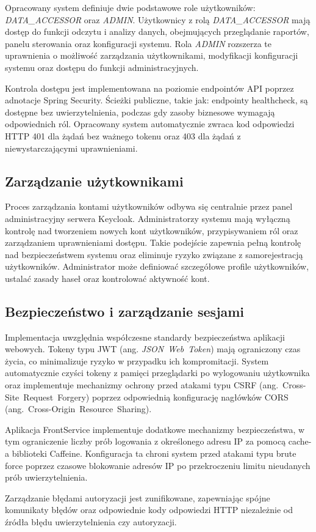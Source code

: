 Opracowany system definiuje dwie podstawowe role użytkowników: \textit{DATA\_ACCESSOR} oraz \textit{ADMIN}. Użytkownicy z rolą \textit{DATA\_ACCESSOR} mają dostęp do funkcji odczytu i analizy danych, obejmujących przeglądanie raportów, panelu sterowania oraz konfiguracji systemu. Rola \textit{ADMIN} rozszerza te uprawnienia o możliwość zarządzania użytkownikami, modyfikacji konfiguracji systemu oraz dostępu do funkcji administracyjnych.

Kontrola dostępu jest implementowana na poziomie endpointów API poprzez adnotacje Spring Security. Ścieżki publiczne, takie jak: endpointy healthcheck, są dostępne bez uwierzytelnienia, podczas gdy zasoby biznesowe wymagają odpowiednich ról. Opracowany system automatycznie zwraca kod odpowiedzi HTTP 401 dla żądań bez ważnego tokenu oraz 403 dla żądań z niewystarczającymi uprawnieniami.

\subsection{Zarządzanie użytkownikami}

Proces zarządzania kontami użytkowników odbywa się centralnie przez panel administracyjny serwera Keycloak. Administratorzy systemu mają wyłączną kontrolę nad tworzeniem nowych kont użytkowników, przypisywaniem ról oraz zarządzaniem uprawnieniami dostępu. Takie podejście zapewnia pełną kontrolę nad bezpieczeństwem systemu oraz eliminuje ryzyko związane z samorejestracją użytkowników. Administrator może definiować szczegółowe profile użytkowników, ustalać zasady haseł oraz kontrolować aktywność kont. 

\subsection{Bezpieczeństwo i zarządzanie sesjami}

Implementacja uwzględnia współczesne standardy bezpieczeństwa aplikacji webowych. Tokeny typu JWT (ang. \mbox{\textit{JSON Web Token}}) mają ograniczony czas życia, co minimalizuje ryzyko w przypadku ich kompromitacji. System automatycznie czyści tokeny z pamięci przeglądarki po wylogowaniu użytkownika oraz implementuje mechanizmy ochrony przed atakami typu CSRF (ang.~\mbox{Cross-Site Request Forgery}) poprzez odpowiednią konfigurację nagłówków CORS \\ (ang.~\mbox{Cross-Origin Resource Sharing}).

Aplikacja FrontService implementuje dodatkowe mechanizmy bezpieczeństwa, w tym ograniczenie liczby prób logowania z określonego adresu IP za pomocą cache-a biblioteki Caffeine. Konfiguracja ta chroni system przed atakami typu brute force poprzez czasowe blokowanie adresów IP po przekroczeniu limitu nieudanych prób uwierzytelnienia.

Zarządzanie błędami autoryzacji jest zunifikowane, zapewniając spójne komunikaty błędów oraz odpowiednie kody odpowiedzi HTTP niezależnie od źródła błędu uwierzytelnienia czy autoryzacji.